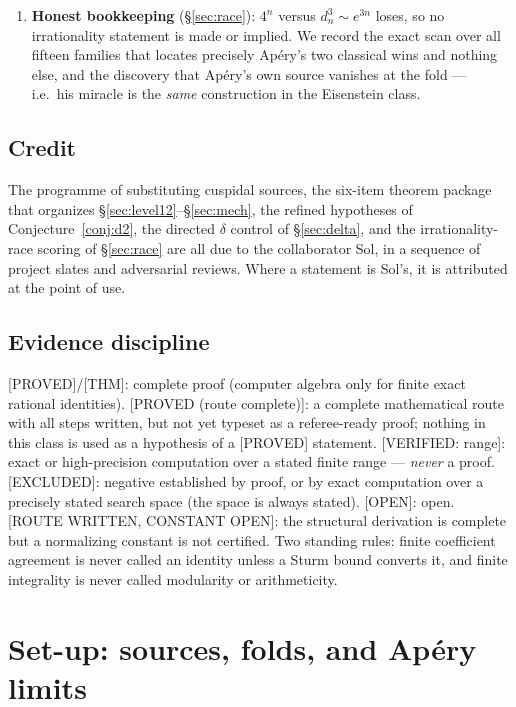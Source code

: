\documentclass[11pt,reqno]{amsart}
\theoremstyle{plain}
\theoremstyle{definition}
\theoremstyle{remark}
\newcommand{\Thm}{\textup{\textsf{[THM]}}}
\newcommand{\Proved}{\textup{\textsf{[PROVED]}}}
\newcommand{\ProvedS}{\textup{\textsf{[PROVED (route complete)]}}}
\newcommand{\VerifiedR}[1]{\textup{\textsf{[VERIFIED: #1]}}}
\newcommand{\Excluded}{\textup{\textsf{[EXCLUDED]}}}
\newcommand{\Open}{\textup{\textsf{[OPEN]}}}
\newcommand{\RouteOpen}{\textup{\textsf{[ROUTE WRITTEN, CONSTANT OPEN]}}}
\begin{document}
\begin{enumerate}[leftmargin=2em]
isolates fold-vanishing as the operative hypothesis, and a classification
corollary shows $\alpha$ is the \emph{unique} order-$3$ sporadic family
admitting the construction.
\item \textbf{Honest bookkeeping} (\S\ref{sec:race}): $4^n$ versus
$d_n^3\sim e^{3n}$ loses, so no irrationality statement is made or implied.
We record the exact scan over all fifteen families that locates precisely
Ap\'ery's two classical wins and nothing else, and the discovery that
Ap\'ery's own source vanishes at the fold --- i.e.\ his miracle is the
\emph{same} construction in the Eisenstein class.
\end{enumerate}

\subsection{Credit}
The programme of substituting cuspidal sources, the six-item theorem
package that organizes \S\ref{sec:level12}--\S\ref{sec:mech}, the refined
hypotheses of Conjecture~\ref{conj:d2}, the directed $\delta$ control of
\S\ref{sec:delta}, and the irrationality-race scoring of
\S\ref{sec:race} are all due to the collaborator Sol, in a sequence of
project slates and adversarial reviews. Where a statement is Sol's, it is
attributed at the point of use.

\subsection{Evidence discipline}\label{sec:labels}
\Proved/\Thm: complete proof (computer algebra only for finite exact
rational identities). \ProvedS: a complete mathematical route with all
steps written, but not yet typeset as a referee-ready proof; nothing in
this class is used as a hypothesis of a \Proved{} statement.
\VerifiedR{range}: exact or high-precision computation over a stated finite
range --- \emph{never} a proof. \Excluded: negative established by proof,
or by exact computation over a precisely stated search space (the space is
always stated). \Open: open. \RouteOpen: the structural derivation is
complete but a normalizing constant is not certified. Two standing rules:
finite coefficient agreement is never called an identity unless a Sturm
bound converts it, and finite integrality is never called modularity or
arithmeticity.

\section{Set-up: sources, folds, and Ap\'ery limits}\label{sec:setup}
\end{document}

